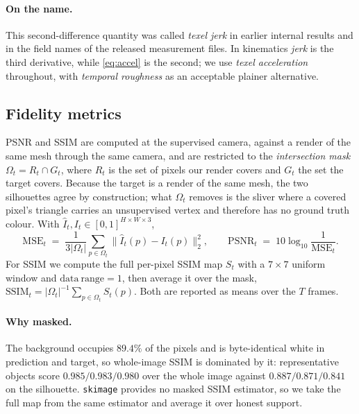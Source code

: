 \paragraph{On the name.} This second-difference quantity was called \emph{texel jerk}
in earlier internal results and in the field names of the released measurement files.
In kinematics \emph{jerk} is the third derivative, while \eqref{eq:accel} is the
second; we use \emph{texel acceleration} throughout, with \emph{temporal roughness} as
an acceptable plainer alternative.

\subsection{Fidelity metrics}

PSNR and SSIM are computed at the supervised camera, against a render of the same mesh
through the same camera, and are restricted to the \emph{intersection mask}
$\Omega_t = R_t \cap G_t$, where $R_t$ is the set of pixels our render covers and
$G_t$ the set the target covers. Because the target is a render of the same mesh, the
two silhouettes agree by construction; what $\Omega_t$ removes is the sliver where a
covered pixel's triangle carries an unsupervised vertex and therefore has no ground
truth colour. With $\hat{I}_t, I_t \in [0,1]^{H \times W \times 3}$,
\begin{equation}
  \mathrm{MSE}_t \;=\; \frac{1}{3|\Omega_t|}
    \sum_{p \in \Omega_t} \big\| \hat{I}_t(p) - I_t(p) \big\|_2^2 ,
  \qquad
  \mathrm{PSNR}_t \;=\; 10 \log_{10}\!\frac{1}{\mathrm{MSE}_t}.
  \label{eq:psnr}
\end{equation}
For SSIM we compute the full per-pixel SSIM map $S_t$ with a $7{\times}7$ uniform
window and $\mathrm{data\ range}=1$, then average it over the mask,
$\mathrm{SSIM}_t = |\Omega_t|^{-1}\sum_{p \in \Omega_t} S_t(p)$. Both are reported as
means over the $T$ frames.

\paragraph{Why masked.} The background occupies $89.4\%$ of the pixels and is
byte-identical white in prediction and target, so whole-image SSIM is dominated by it:
representative objects score $0.985 / 0.983 / 0.980$ over the whole image against
$0.887 / 0.871 / 0.841$ on the silhouette. \texttt{skimage} provides no masked SSIM
estimator, so we take the full map from the same estimator and average it over honest
support.

